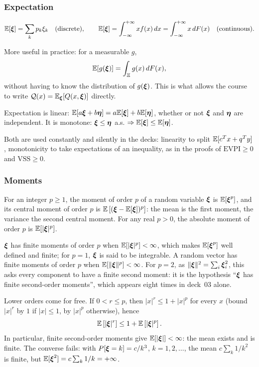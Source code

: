 \documentclass[aspectratio=169]{beamer}
\newcommand{\EVPI}{\mathrm{EVPI}}
\newcommand{\VSS}{\mathrm{VSS}}
\begin{document}
\begin{frame}
\frametitle{Expectation}
\small

\[
{\mathbb{E}}[{\boldsymbol{\xi}}] = \sum_k p_k \xi_k \quad \text{(discrete)}, \qquad
{\mathbb{E}}[{\boldsymbol{\xi}}] = \int_{-\infty}^{+\infty} x f(x)\,dx = \int_{-\infty}^{+\infty} x\,dF(x) \quad \text{(continuous)}.
\]

\mbox{}

More useful in practice: for a measurable $g$,
\[
{\mathbb{E}}[g({\boldsymbol{\xi}})] = \int_{\Xi} g(x)\,dF(x),
\]
{\red without} having to know the distribution of $g({\boldsymbol{\xi}})$. This is what allows the course to write ${\mathcal{Q}}(x) = {\mathbb{E}}_{{\boldsymbol{\xi}}}[Q(x,{\boldsymbol{\xi}})]$ directly.

\mbox{}

Expectation is {\red linear}: ${\mathbb{E}}[a{\boldsymbol{\xi}} + b{\boldsymbol{\eta}}] = a{\mathbb{E}}[{\boldsymbol{\xi}}] + b{\mathbb{E}}[{\boldsymbol{\eta}}]$, whether or not ${\boldsymbol{\xi}}$ and ${\boldsymbol{\eta}}$ are independent.
It is {\red monotone}: ${\boldsymbol{\xi}} \leq {\boldsymbol{\eta}}$ a.s. $\Rightarrow {\mathbb{E}}[{\boldsymbol{\xi}}] \leq {\mathbb{E}}[{\boldsymbol{\eta}}]$.

\mbox{}

{\footnotesize Both are used constantly and silently in the decks: linearity to split ${\mathbb{E}}[c^Tx + q^Ty]$, monotonicity to take expectations of an inequality, as in the proofs of $\EVPI \geq 0$ and $\VSS \geq 0$.}

\end{frame}

\begin{frame}
\frametitle{Moments}
\small

For an integer $p \geq 1$, the {\red moment of order $p$} of a random variable ${\boldsymbol{\xi}}$ is ${\mathbb{E}}[{\boldsymbol{\xi}}^p]$, and its {\red central moment} of order $p$ is ${\mathbb{E}}\left[({\boldsymbol{\xi}} - {\mathbb{E}}[{\boldsymbol{\xi}}])^p\right]$: the mean is the first moment, the variance the second central moment.
For any real $p > 0$, the {\red absolute moment} of order $p$ is ${\mathbb{E}}[|{\boldsymbol{\xi}}|^p]$.

\mbox{}

${\boldsymbol{\xi}}$ has {\red finite moments of order $p$} when ${\mathbb{E}}[|{\boldsymbol{\xi}}|^p] < \infty$, which makes ${\mathbb{E}}[{\boldsymbol{\xi}}^p]$ well defined and finite; for $p = 1$, ${\boldsymbol{\xi}}$ is said to be {\red integrable}.
A random vector has finite moments of order $p$ when ${\mathbb{E}}[\|{\boldsymbol{\xi}}\|^p] < \infty$.
For $p = 2$, as $\|{\boldsymbol{\xi}}\|^2 = \sum_i {\boldsymbol{\xi}}_i^2$, this asks every component to have a finite second moment: it is the hypothesis {\red ``${\boldsymbol{\xi}}$ has finite second-order moments''}, which appears eight times in deck~03 alone.

\mbox{}

{\blue Lower orders come for free.} If $0 < r \leq p$, then $|x|^r \leq 1 + |x|^p$ for every $x$ (bound $|x|^r$ by $1$ if $|x| \leq 1$, by $|x|^p$ otherwise), hence
\[
{\mathbb{E}}\left[|{\boldsymbol{\xi}}|^r\right] \leq 1 + {\mathbb{E}}\left[|{\boldsymbol{\xi}}|^p\right].
\]
In particular, finite second-order moments give ${\mathbb{E}}[|{\boldsymbol{\xi}}|] < \infty$: the mean exists and is finite.
The converse fails: with $P[{\boldsymbol{\xi}} = k] = c/k^3$, $k = 1, 2, \ldots$, the mean $c\sum_k 1/k^2$ is finite, but ${\mathbb{E}}[{\boldsymbol{\xi}}^2] = c\sum_k 1/k = +\infty$.

\end{frame}
\end{document}
